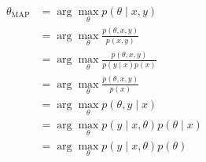 \begin{answer}
	$$
	\begin{aligned}
		\theta_{\text{MAP}} & = \arg \max_{\theta} p(\theta\mid x,y)\\
		& = \arg \max_{\theta} \frac{p(\theta,x,y)}{p(x,y)}\\
		& = \arg \max_{\theta} \frac{p(\theta,x,y)}{p(y\mid x)p(x)}\\
		& = \arg \max_{\theta} \frac{p(\theta,x,y)}{p(x)}\\
		& = \arg \max_{\theta} p(\theta,y\mid x)\\
		& = \arg \max_{\theta} p(y\mid x,\theta)p(\theta\mid x)\\
		& = \arg \max_{\theta} p(y\mid x,\theta)p(\theta)
	\end{aligned}
	$$
\end{answer}
